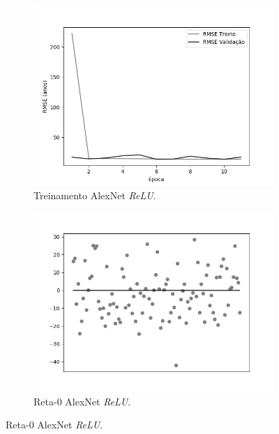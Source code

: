 	\begin{figure}[hb!]
		\caption{Resultados do treinamento e teste da CNN AlexNet.}\label{fig:alexnet-abordagem1}
		\begin{subfigure}[hb]{0.5\linewidth}
			\caption{Treinamento AlexNet \emph{ReLU}.}
			\label{fig:redeneuralbiologica}
			\includegraphics[width=\linewidth]{img/graficos/history/alexnet/fig-history-image-treat-3-alexnet-relu-rmse.png}
		\end{subfigure}
		\begin{subfigure}[hb]{0.5\linewidth}
			\caption{Reta-0 AlexNet \emph{ReLU}.}
			\label{fig:reta0reludying}
			\includegraphics[width=\linewidth]{img/graficos/reta0/alexnet/fig-reta-0-image-treat-3-alexnet-relu.png}%

\end{subfigure}
\end{figure}
